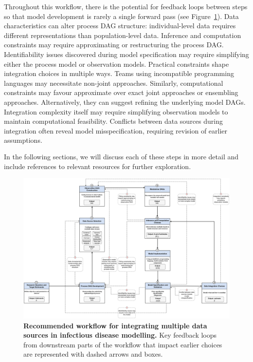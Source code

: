 \documentclass{article}
\begin{document}
Throughout this workflow, there is the potential for feedback loops between steps so that model development is rarely a single forward pass (see Figure~\ref{fig:workflow}). 
Data characteristics can alter process DAG structure: individual-level data requires different representations than population-level data. 
Inference and computation constraints may require approximating or restructuring the process DAG.
Identifiability issues discovered during model specification may require simplifying either the process model or observation models. 
Practical constraints shape integration choices in multiple ways. 
Teams using incompatible programming languages may necessitate non-joint approaches. 
Similarly, computational constraints may favour approximate over exact joint approaches or ensembling approaches.
Alternatively, they can suggest refining the underlying model DAGs.
Integration complexity itself may require simplifying observation models to maintain computational feasibility. 
Conflicts between data sources during integration often reveal model misspecification, requiring revision of earlier assumptions.

In the following sections, we will discuss each of these steps in more detail and include references to relevant resources for further exploration.

\begin{landscape}
\begin{figure}[htbp]
    \centering
    \includegraphics[width=\textwidth]{figures/restructured_workflow.drawio.pdf}
    \caption{\textbf{Recommended workflow for integrating multiple data sources in infectious disease modelling.} Key feedback loops from downstream parts of the workflow that impact earlier choices are represented with dashed arrows and boxes.}
    \label{fig:workflow}
\end{figure}
\end{landscape}
\end{document}
